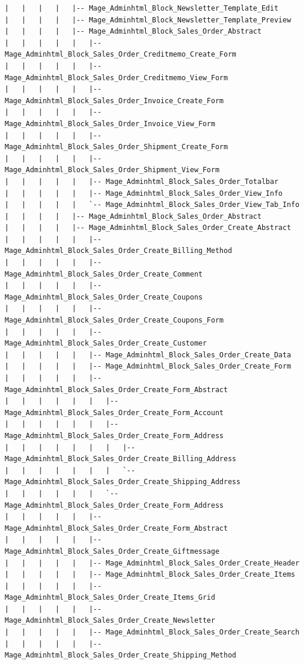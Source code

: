 \documentclass[oneside]{book}
\begin{document}
\begin{lstlisting}
|   |   |   |   |-- Mage_Adminhtml_Block_Newsletter_Template_Edit
|   |   |   |   |-- Mage_Adminhtml_Block_Newsletter_Template_Preview
|   |   |   |   |-- Mage_Adminhtml_Block_Sales_Order_Abstract
|   |   |   |   |   |-- Mage_Adminhtml_Block_Sales_Order_Creditmemo_Create_Form
|   |   |   |   |   |-- Mage_Adminhtml_Block_Sales_Order_Creditmemo_View_Form
|   |   |   |   |   |-- Mage_Adminhtml_Block_Sales_Order_Invoice_Create_Form
|   |   |   |   |   |-- Mage_Adminhtml_Block_Sales_Order_Invoice_View_Form
|   |   |   |   |   |-- Mage_Adminhtml_Block_Sales_Order_Shipment_Create_Form
|   |   |   |   |   |-- Mage_Adminhtml_Block_Sales_Order_Shipment_View_Form
|   |   |   |   |   |-- Mage_Adminhtml_Block_Sales_Order_Totalbar
|   |   |   |   |   |-- Mage_Adminhtml_Block_Sales_Order_View_Info
|   |   |   |   |   `-- Mage_Adminhtml_Block_Sales_Order_View_Tab_Info
|   |   |   |   |-- Mage_Adminhtml_Block_Sales_Order_Abstract
|   |   |   |   |-- Mage_Adminhtml_Block_Sales_Order_Create_Abstract
|   |   |   |   |   |-- Mage_Adminhtml_Block_Sales_Order_Create_Billing_Method
|   |   |   |   |   |-- Mage_Adminhtml_Block_Sales_Order_Create_Comment
|   |   |   |   |   |-- Mage_Adminhtml_Block_Sales_Order_Create_Coupons
|   |   |   |   |   |-- Mage_Adminhtml_Block_Sales_Order_Create_Coupons_Form
|   |   |   |   |   |-- Mage_Adminhtml_Block_Sales_Order_Create_Customer
|   |   |   |   |   |-- Mage_Adminhtml_Block_Sales_Order_Create_Data
|   |   |   |   |   |-- Mage_Adminhtml_Block_Sales_Order_Create_Form
|   |   |   |   |   |-- Mage_Adminhtml_Block_Sales_Order_Create_Form_Abstract
|   |   |   |   |   |   |-- Mage_Adminhtml_Block_Sales_Order_Create_Form_Account
|   |   |   |   |   |   |-- Mage_Adminhtml_Block_Sales_Order_Create_Form_Address
|   |   |   |   |   |   |   |-- Mage_Adminhtml_Block_Sales_Order_Create_Billing_Address
|   |   |   |   |   |   |   `-- Mage_Adminhtml_Block_Sales_Order_Create_Shipping_Address
|   |   |   |   |   |   `-- Mage_Adminhtml_Block_Sales_Order_Create_Form_Address
|   |   |   |   |   |-- Mage_Adminhtml_Block_Sales_Order_Create_Form_Abstract
|   |   |   |   |   |-- Mage_Adminhtml_Block_Sales_Order_Create_Giftmessage
|   |   |   |   |   |-- Mage_Adminhtml_Block_Sales_Order_Create_Header
|   |   |   |   |   |-- Mage_Adminhtml_Block_Sales_Order_Create_Items
|   |   |   |   |   |-- Mage_Adminhtml_Block_Sales_Order_Create_Items_Grid
|   |   |   |   |   |-- Mage_Adminhtml_Block_Sales_Order_Create_Newsletter
|   |   |   |   |   |-- Mage_Adminhtml_Block_Sales_Order_Create_Search
|   |   |   |   |   |-- Mage_Adminhtml_Block_Sales_Order_Create_Shipping_Method

\end{lstlisting}
\end{document}
